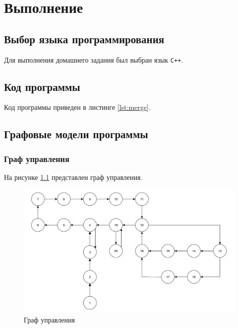 \chapter{Выполнение}

\section{Выбор языка программирования}
Для выполнения домашнего задания был выбран язык \texttt{C++}.

\section{Код программы}

Код программы приведен в листинге \ref{lst:merge}.



\section{Графовые модели программы}

\subsection{Граф управления}

На рисунке \ref{fg:mg} представлен граф управления.

\begin{figure}[h]
	\centering
	\includegraphics[height=0.4\textheight]{img/граф_управления.pdf}
	\caption{Граф управления}
	\label{fg:mg}
\end{figure}

\clearpage

